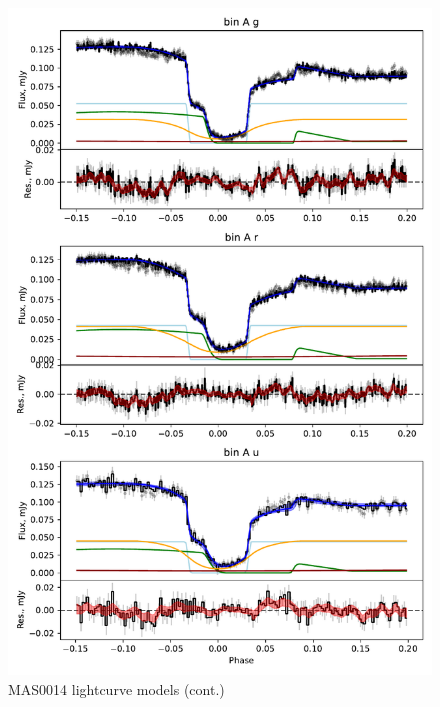 \begin{figure}
    \centering
    \includegraphics[width=\textwidth]{figures/results/MASOT0014/MASOT0014_3.pdf}
    \caption{MAS0014 lightcurve models (cont.)}
    \label{fig:MAS0014 all lightcurves cont 2}
\end{figure}
